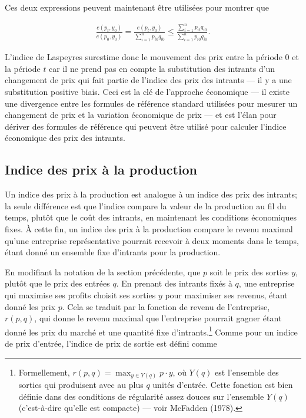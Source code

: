 \documentclass[]{article}
\begin{document}
Ces deux expressions peuvent maintenant être utilisées pour montrer que

\begin{align*}
\frac{e(p_{t}, y_{0})}{e(p_{0}, y_{0})} = \frac{e(p_{t}, y_{0})}{\sum_{i = 1}^{n} p_{i0} q_{i0}} \leq \frac{\sum_{i = 1}^{n} p_{it} q_{i0}}{\sum_{i = 1 }^{n} p_{i0} q_{i0}}.
\end{align*}

L'indice de Laspeyres surestime donc le mouvement des prix entre la période 0 et la période \(t\) car il ne prend pas en compte la substitution des intrants d'un changement de prix qui fait partie de l'indice des prix des intrants --- il y a une substitution positive biais. Ceci est la clé de l'approche économique --- il existe une divergence entre les formules de référence standard utilisées pour mesurer un changement de prix et la variation économique de prix --- et est l'élan pour dériver des formules de référence qui peuvent être utilisé pour calculer l'indice économique des prix des intrants.

\hypertarget{indice-des-prix-uxe0-la-production}{%
\subsection{Indice des prix à la production}\label{indice-des-prix-uxe0-la-production}}

Un indice des prix à la production est analogue à un indice des prix des intrants; la seule différence est que l'indice compare la valeur de la production au fil du temps, plutôt que le coût des intrants, en maintenant les conditions économiques fixes. À cette fin, un indice des prix à la production compare le revenu maximal qu'une entreprise représentative pourrait recevoir à deux moments dans le temps, étant donné un ensemble fixe d'intrants pour la production.

En modifiant la notation de la section précédente, que \(p\) soit le prix des sorties \(y\), plutôt que le prix des entrées \(q\). En prenant des intrants fixés à \(q\), une entreprise qui maximise ses profits choisit ses sorties \(y\) pour maximiser ses revenus, étant donné les prix \(p\). Cela se traduit par la fonction de revenu de l'entreprise, \(r(p, q)\), qui donne le revenu maximal que l'entreprise pourrait gagner étant donné les prix du marché et une quantité fixe d'intrants.\footnote{Formellement, \(r(p, q) = \max_{y \in Y (q)} p \cdot y\), où \(Y(q)\) est l'ensemble des sorties qui produisent avec au plus \(q\) unités d'entrée. Cette fonction est bien définie dans des conditions de régularité assez douces sur l'ensemble \(Y(q)\) (c'est-à-dire qu'elle est compacte) --- voir McFadden (1978).} Comme pour un indice de prix d'entrée, l'indice de prix de sortie est défini comme
\end{document}
